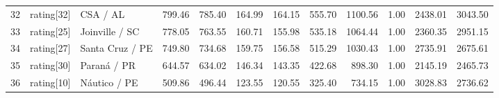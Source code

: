 \begin{table}[ht]
\begin{tabular}{rllrrrrrrrrr}
  32 & rating[32] & CSA / AL & 799.46 & 785.40 & 164.99 & 164.15 & 555.70 & 1100.56 & 1.00 & 2438.01 & 3043.50 \\ 
  33 & rating[25] & Joinville / SC & 778.05 & 763.55 & 160.71 & 155.98 & 535.18 & 1064.44 & 1.00 & 2360.35 & 2951.15 \\ 
  34 & rating[27] & Santa Cruz / PE & 749.80 & 734.68 & 159.75 & 156.58 & 515.29 & 1030.43 & 1.00 & 2735.91 & 2675.61 \\ 
  35 & rating[30] & Paraná / PR & 644.57 & 634.02 & 146.34 & 143.35 & 422.68 & 898.30 & 1.00 & 2145.19 & 2465.73 \\ 
  36 & rating[10] & Náutico / PE & 509.86 & 496.44 & 123.55 & 120.55 & 325.40 & 734.15 & 1.00 & 3028.83 & 2736.62 \\ 
   \hline
\end{tabular}
\end{table}
